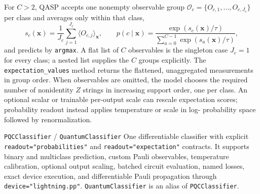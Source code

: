 \documentclass[10pt]{article}
\newcommand{\code}[1]{\texttt{#1}}
\begin{document}
For $C>2$, QASP accepts one nonempty observable group
$\mathcal O_c=\{O_{c,1},\ldots,O_{c,J_c}\}$ per class and averages only
within that class,
\begin{equation}
  s_c(\bm x)=\frac{1}{J_c}\sum_{j=1}^{J_c}
  \langle O_{c,j}\rangle_{\bm x},
  \qquad
  p(c\mid\bm x)=\frac{\exp(s_c(\bm x)/\tau)}
  {\sum_{a=0}^{C-1}\exp(s_a(\bm x)/\tau)},
  \label{eq:classifier-multiclass-score}
\end{equation}
and predicts by \code{argmax}.  A flat list of $C$ observables is the singleton
case $J_c=1$ for every class; a nested list supplies the $C$ groups explicitly.
The \code{expectation\_values} method returns the flattened, unaggregated
measurements in group order.  When observables are omitted, the model chooses
the required number of nonidentity $Z$ strings in increasing support order,
one per class.
An optional scalar or trainable per-output scale can rescale expectation
scores; probability readout instead applies temperature or scale in log-
probability space followed by renormalization.

\begin{qaspfeature}{\code{PQCClassifier} / \code{QuantumClassifier}}
One differentiable classifier with explicit \code{readout="probabilities"}
and \code{readout="expectation"} contracts.  It supports binary and multiclass
prediction, custom Pauli observables, temperature calibration, optional output
scaling, batched circuit evaluation, named losses, exact device execution, and
differentiable Pauli propagation through \code{device="lightning.pp"}.
\code{QuantumClassifier} is an alias of \code{PQCClassifier}.
\end{qaspfeature}
\end{document}
